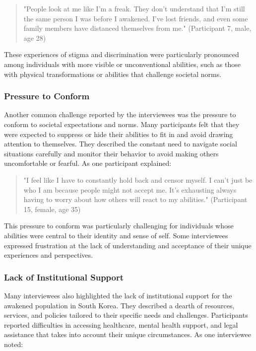 \documentclass[12pt, a4paper]{article}
\begin{document}
\begin{quote}
    "People look at me like I'm a freak. They don't understand that I'm still the same person I was before I awakened. I've lost friends, and even some family members have distanced themselves from me." (Participant 7, male, age 28)
\end{quote}

These experiences of stigma and discrimination were particularly pronounced among individuals with more visible or unconventional abilities, such as those with physical transformations or abilities that challenge societal norms.

\subsubsection{Pressure to Conform}
Another common challenge reported by the interviewees was the pressure to conform to societal expectations and norms. Many participants felt that they were expected to suppress or hide their abilities to fit in and avoid drawing attention to themselves. They described the constant need to navigate social situations carefully and monitor their behavior to avoid making others uncomfortable or fearful. As one participant explained:

\begin{quote}
    "I feel like I have to constantly hold back and censor myself. I can't just be who I am because people might not accept me. It's exhausting always having to worry about how others will react to my abilities." (Participant 15, female, age 35)
\end{quote}

This pressure to conform was particularly challenging for individuals whose abilities were central to their identity and sense of self. Some interviewees expressed frustration at the lack of understanding and acceptance of their unique experiences and perspectives.

\subsubsection{Lack of Institutional Support}
Many interviewees also highlighted the lack of institutional support for the awakened population in South Korea. They described a dearth of resources, services, and policies tailored to their specific needs and challenges. Participants reported difficulties in accessing healthcare, mental health support, and legal assistance that takes into account their unique circumstances. As one interviewee noted:
\end{document}
